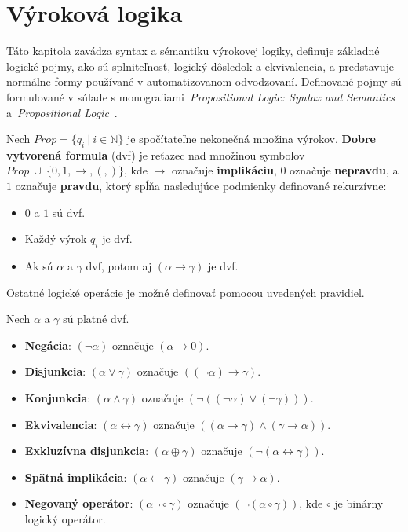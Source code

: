 \section{Výroková logika}\label{sec:propositional_logic}
Táto kapitola zavádza syntax a sémantiku výrokovej logiky, definuje základné logické pojmy, ako sú splniteľnosť, logický dôsledok a ekvivalencia, a predstavuje normálne formy používané v automatizovanom odvodzovaní. Definované pojmy sú formulované v súlade s monografiami~\textit{Propositional Logic: Syntax and Semantics}~\cite{propositional-logic} a~\textit{Propositional Logic}~\cite{propositional-logi-bog}.


\begin{definition}
    Nech $Prop = \{q_i ~|~ i \in \mathbb{N}\}$ je spočítateľne nekonečná množina výrokov. \textbf{Dobre vytvorená formula} (\acrshort{dvf}) je reťazec nad množinou symbolov
    $Prop ~\cup~ \{0, 1, \xrightarrow{}, (, )\}$, kde $\xrightarrow{}$ označuje \textbf{implikáciu}, $0$ označuje \textbf{nepravdu}, a $1$ označuje \textbf{pravdu}, ktorý spĺňa nasledujúce podmienky definované rekurzívne:
    \begin{itemize}
        \item $0$ a $1$ sú \acrshort{dvf}.
        \item Každý výrok $q_i$ je \acrshort{dvf}.
        \item Ak sú $\alpha$ a $\gamma$ \acrshort{dvf}, potom aj $(\alpha \xrightarrow{} \gamma)$ je \acrshort{dvf}.
    \end{itemize}
\end{definition}

Ostatné logické operácie je možné definovať pomocou uvedených pravidiel.

\begin{definition}
    Nech $\alpha$ a $\gamma$ sú platné \acrshort{dvf}.
    \begin{itemize}
        \item \textbf{Negácia}: $(\lnot \alpha)$ označuje $(\alpha \xrightarrow{} 0)$.
        \item \textbf{Disjunkcia}: $(\alpha \lor \gamma)$ označuje $((\lnot \alpha) \xrightarrow{} \gamma)$.
        \item \textbf{Konjunkcia}: $(\alpha \land \gamma)$ označuje $(\lnot((\lnot \alpha) \lor (\lnot \gamma)))$.
        \item \textbf{Ekvivalencia}: $(\alpha \leftrightarrow \gamma)$ označuje $((\alpha \xrightarrow{} \gamma) \land (\gamma \xrightarrow{} \alpha))$.
        \item \textbf{Exkluzívna disjunkcia}: $(\alpha \oplus \gamma)$ označuje $(\lnot(\alpha \leftrightarrow \gamma))$.
        \item \textbf{Spätná implikácia}: $(\alpha \xleftarrow{} \gamma)$ označuje $(\gamma \xrightarrow{} \alpha)$.
        \item \textbf{Negovaný operátor}: $(\alpha \lnot\circ \gamma)$ označuje $(\lnot(\alpha \circ \gamma))$, kde $\circ$ je binárny logický operátor.
    \end{itemize}
\end{definition}


